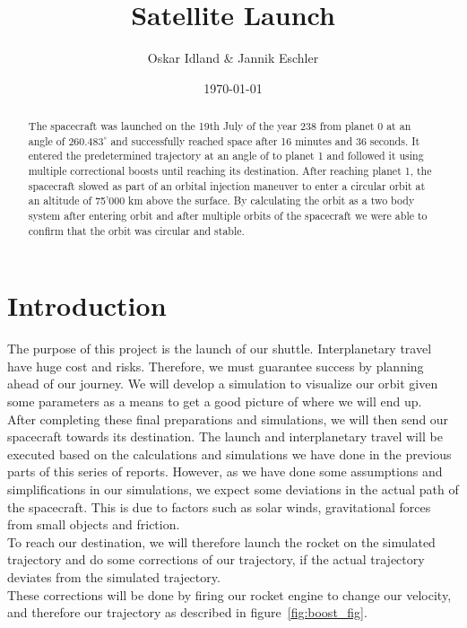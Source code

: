 \documentclass[reprint,english,notitlepage]{revtex4-2}
\begin{document}
\title{Satellite Launch}
\author{Oskar Idland \& Jannik Eschler}
\date{\today}

\begin{abstract}
    The spacecraft was launched on the 19th July of the year 238 from planet 0 at an angle of $260.483^{\circ}$ and successfully reached space after 16 minutes and 36 seconds.
    It entered the predetermined trajectory at an angle of to planet 1 and followed it using multiple correctional boosts until reaching its destination.
    After reaching planet 1, the spacecraft slowed as part of an orbital injection maneuver to enter a circular orbit at an altitude of 75'000 km above the surface.
    By calculating the orbit as a two body system after entering orbit and after multiple orbits of the spacecraft we were able to confirm that the orbit was circular and stable.
\end{abstract}
\maketitle

\section{Introduction} \label{sec:introduction}
The purpose of this project is the launch of our shuttle.
Interplanetary travel have huge cost and risks.
Therefore, we must guarantee success by planning ahead of our journey.
We will develop a simulation to visualize our orbit given some parameters as a means to get a good picture of where we will end up.\\

After completing these final preparations and simulations, we will then send our spacecraft towards its destination.
The launch and interplanetary travel will be executed based on the calculations and simulations we have done in the previous parts of this series of reports.
However, as we have done some assumptions and simplifications in our simulations, we expect some deviations in the actual path of the spacecraft.
This is due to factors such as solar winds, gravitational forces from small objects and friction.\\
To reach our destination, we will therefore launch the rocket on the simulated trajectory and do some corrections of our trajectory, if the actual trajectory deviates from the simulated trajectory.\\
These corrections will be done by firing our rocket engine to change our velocity, and therefore our trajectory as described in figure~\ref{fig:boost_fig}.
\end{document}
